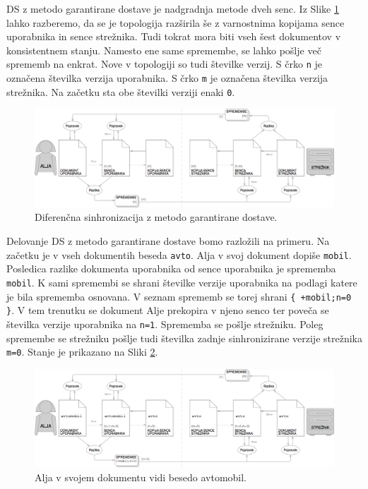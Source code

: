 \documentclass[a4paper, 12pt, twoside]{book}
\begin{document}
DS z metodo garantirane dostave je nadgradnja metode dveh senc. Iz Slike \ref{ds3} lahko razberemo, da se je topologija razširila še z varnostnima kopijama sence uporabnika in sence strežnika. Tudi tokrat mora biti vseh šest dokumentov v konsistentnem stanju. Namesto ene same spremembe, se lahko pošlje več sprememb na enkrat. Nove v topologiji so tudi številke verzij. S črko {\tt n} je označena številka verzija uporabnika. S črko {\tt m} je označena številka verzija strežnika. Na začetku sta obe številki verziji enaki {\tt 0}.

\begin{figure}[placement h]
\begin{center}
\includegraphics[width=16cm]{ds3.png}
\end{center}
\caption{Diferenčna sinhronizacija z metodo garantirane dostave.}
\label{ds3}
\end{figure}

Delovanje DS z metodo garantirane dostave bomo razložili na primeru. Na začetku je v vseh dokumentih beseda {\tt avto}. Alja v svoj dokument dopiše {\tt mobil}. Posledica razlike dokumenta uporabnika od sence uporabnika je sprememba {\tt mobil}. K sami spremembi se shrani številke verzije uporabnika na podlagi katere je bila sprememba osnovana. V seznam sprememb se torej shrani {\tt \{ +mobil;n=0 \}}. V tem trenutku se dokument Alje prekopira v njeno senco ter poveča se številka verzije uporabnika na {\tt n=1}. Sprememba se pošlje strežniku. Poleg spremembe se strežniku pošlje tudi številka zadnje sinhronizirane verzije strežnika {\tt m=0}. Stanje je prikazano na Sliki \ref{ds4}.

\begin{figure}[placement h]
\begin{center}
\includegraphics[width=16cm]{ds4.png}
\end{center}
\caption{Alja v svojem dokumentu vidi besedo avtomobil.}
\label{ds4}
\end{figure}
\end{document}
